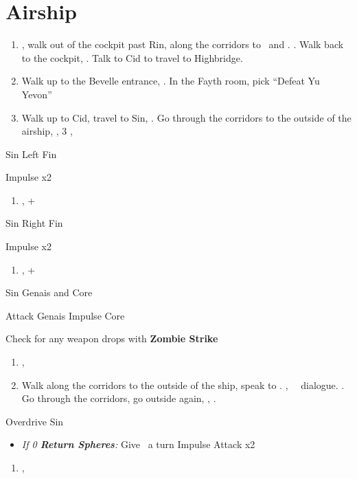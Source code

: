 \chapter{Airship}
\begin{enumerate}
	\item \sd, walk out of the cockpit past Rin, along the corridors to \yuna\ and \kimahri. \sd. Walk back to the cockpit, \sd. Talk to Cid to travel to Highbridge.
	\item Walk up to the Bevelle entrance, \sd. In the Fayth room, pick ``Defeat Yu Yevon''
	\item Walk up to Cid, travel to Sin, \sd. Go through the corridors to the outside of the airship, \sd, 3 \skippablefmv[2:10], \sd
\end{enumerate}
\begin{battle}[65000]{Sin Left Fin}
\begin{itemize}
	\summon{\bahamut}
	\bahamutf Impulse x2
\end{itemize}
\end{battle}
\begin{enumerate}[resume]
	\item \sd, \cs+\skippablefmv
\end{enumerate}
\begin{battle}[65000]{Sin Right Fin}
\begin{itemize}
	\summon{\bahamut}
	\bahamutf Impulse x2
\end{itemize}
\end{battle}
\begin{enumerate}[resume]
	\item \sd, \cs+\skippablefmv
\end{enumerate}
\begin{battle}[56000]{Sin Genais and Core}
\begin{itemize}
	\summon{\bahamut}
	\bahamutf Attack Genais
	\bahamutf Impulse Core
\end{itemize}
Check for any weapon drops with \textbf{Zombie Strike}
\end{battle}
\begin{enumerate}[resume]
	\item \sd, \skippablefmv
	\item Walk along the corridors to the outside of the ship, speak to \yuna. \cs[1:40], \sd\ \rikku\ dialogue. \skippablefmv. Go through the corridors, go outside again, \skippablefmv, \sd.
\end{enumerate}
\begin{battle}[140000]{Overdrive Sin}
\begin{itemize}
	\item \textit{If 0 \textbf{Return Spheres}:} Give \tidus\ a turn
	\summon{\bahamut}
	\bahamutf Impulse
	\bahamutf Attack x2
\end{itemize}
\end{battle}
\begin{enumerate}[resume]
	\item \skippablefmv[1:20], \sd
\end{enumerate}